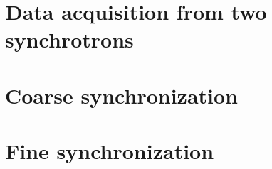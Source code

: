 \section{Data acquisition from two synchrotrons}
\section{Coarse synchronization}
\section{Fine synchronization}


